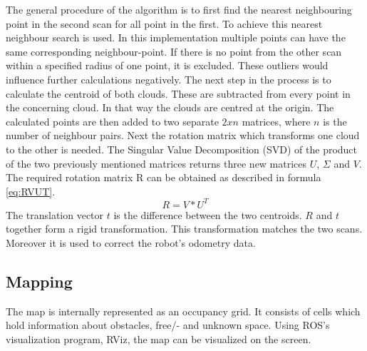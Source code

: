 \documentclass{ba-kecs}
\begin{document}
The general procedure of the algorithm is to first find the nearest neighbouring point in the second scan for all point in the first. To achieve this nearest neighbour search is used.
In this implementation multiple points can have the same corresponding neighbour-point. If there is no point from the other scan within a specified radius of one point, it is excluded. These outliers would influence further calculations negatively.
The next step in the process is to calculate the centroid of both clouds. These are subtracted from every point in the concerning cloud. In that way the clouds are centred at the origin. The calculated points are then added to two separate $2xn$ matrices, where $n$ is the number of neighbour pairs. Next the rotation matrix which transforms one cloud to the other is needed. The Singular Value Decomposition (SVD) of the product of the two previously mentioned matrices returns three new matrices $U$, $\Sigma$ and $V$. The required rotation matrix R can be obtained as described in formula \ref{eq:RVUT}.
\begin{equation}
\label{eq:RVUT}
 R = V * U^T
\end{equation}
The translation vector $t$ is the difference between the two centroids. $R$ and $t$ together form a rigid transformation. This transformation matches the two scans. Moreover it is used to correct the robot's odometry data.

\subsection{Mapping}\label{sec:mapping}

The map is internally represented as an occupancy grid. It consists of cells which hold information about obstacles, free/- and unknown space. Using ROS's visualization program, RViz, the map can be visualized on the screen.
\end{document}
